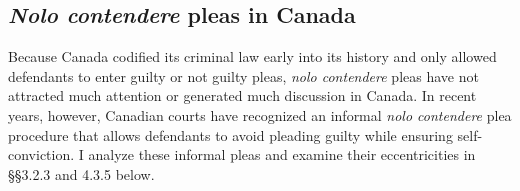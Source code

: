 \subsection{\textit{Nolo contendere} pleas in Canada}

Because Canada codified its criminal law early into its history and only allowed defendants to enter guilty or not guilty pleas, \textit{nolo contendere} pleas have not attracted much attention or generated much discussion in Canada. In recent years, however, Canadian courts have recognized an informal \textit{nolo contendere} plea procedure that allows defendants to avoid pleading guilty while ensuring self-conviction. I analyze these informal pleas and examine their eccentricities in \S\S 3.2.3 and 4.3.5 below.